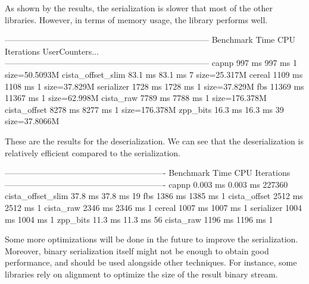 As shown by the results, the serialization is slower that most of the other
libraries. However, in terms of memory usage, the library performs well.

\begin{terminal}
--------------------------------------------------------------------------
Benchmark                Time             CPU   Iterations UserCounters...
--------------------------------------------------------------------------
capnp                  997 ms          997 ms            1 size=50.5093M
cista_offset_slim     83.1 ms         83.1 ms            7 size=25.317M
cereal                1109 ms         1108 ms            1 size=37.829M
serializer            1728 ms         1728 ms            1 size=37.829M
fbs                  11369 ms        11367 ms            1 size=62.998M
cista_raw             7789 ms         7788 ms            1 size=176.378M
cista_offset          8278 ms         8277 ms            1 size=176.378M
zpp_bits              16.3 ms         16.3 ms           39 size=37.8066M
\end{terminal}\leavevmode\newline

These are the results for the deserialization. We can see that the
deserialization is relatively efficient compared to the serialization.

\begin{terminal}
----------------------------------------------------------
Benchmark                Time             CPU   Iterations
----------------------------------------------------------
capnp                0.003 ms        0.003 ms       227360
cista_offset_slim     37.8 ms         37.8 ms           19
fbs                   1386 ms         1385 ms            1
cista_offset          2512 ms         2512 ms            1
cista_raw             2346 ms         2346 ms            1
cereal                1007 ms         1007 ms            1
serializer            1004 ms         1004 ms            1
zpp_bits              11.3 ms         11.3 ms           56
cista_raw             1196 ms         1196 ms            1
\end{terminal}\leavevmode\newline

Some more optimizations will be done in the future to improve the serialization.
Moreover, binary serialization itself might not be enough to obtain good
performance, and should be used alongside other techniques. For instance, some
libraries rely on alignment to optimize the size of the result binary stream.

